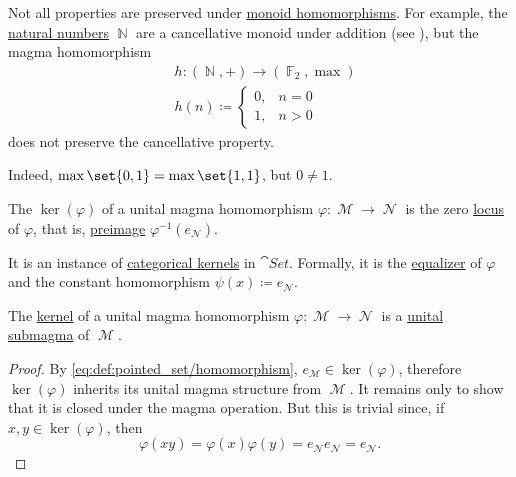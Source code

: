 \begin{example}\label{ex:monoid_cancellation_not_preserved_by_homomorphism}
  Not all properties are preserved under \hyperref[def:unital_magma/homomorphism]{monoid homomorphisms}. For example, the \hyperref[def:set_of_natural_numbers]{natural numbers} \( \BbbN \) are a cancellative monoid under addition (see ), but the magma homomorphism
  \begin{equation*}
    \begin{aligned}
      &h: (\BbbN, +) \to (\hyperref[thm:galois_field_existence]{\BbbF_2}, \max) \\
      &h(n) \coloneqq \begin{cases}
        0, &n = 0 \\
        1, &n > 0
      \end{cases}
    \end{aligned}
  \end{equation*}
  does not preserve the cancellative property.

  Indeed, \( \max\set{ 0, 1} = \max\set{ 1, 1 } \), but \( 0 \neq 1 \).
\end{example}

\begin{definition}\label{def:unital_magma_kernel}
  The  \( \ker(\varphi) \) of a unital magma homomorphism \( \varphi: \mscrM \to \mscrN \) is the zero \hyperref[def:zero_locus]{locus} of \( \varphi \), that is, \hyperref[thm:function_properties/preimage]{preimage} \( \varphi^{-1}(e_{\mscrN}) \).

  It is an instance of \hyperref[def:categorical_kernel]{categorical kernels} in \hyperref[def:category_of_sets]{\( \cat{Set} \)}. Formally, it is the \hyperref[thm:set_categorical_limits/equalizer]{equalizer} of \( \varphi \) and the constant homomorphism \( \psi(x) \coloneqq e_{\mscrN} \).
\end{definition}

\begin{proposition}\label{thm:unital_magma_kernel_is_submagma}
  The \hyperref[def:unital_magma_kernel]{kernel} of a unital magma homomorphism \( \varphi: \mscrM \to \mscrN \) is a \hyperref[def:first_order_substructure]{unital submagma} of \( \mscrM \).
\end{proposition}
\begin{proof}
  By \eqref{eq:def:pointed_set/homomorphism}, \( e_{\mscrM} \in \ker(\varphi) \), therefore \( \ker(\varphi) \) inherits its unital magma structure from \( \mscrM \). It remains only to show that it is closed under the magma operation. But this is trivial since, if \( x, y \in \ker(\varphi) \), then
  \begin{equation*}
    \varphi(xy) = \varphi(x) \varphi(y) = e_{\mscrN} e_{\mscrN} = e_{\mscrN}.
  \end{equation*}
\end{proof}
